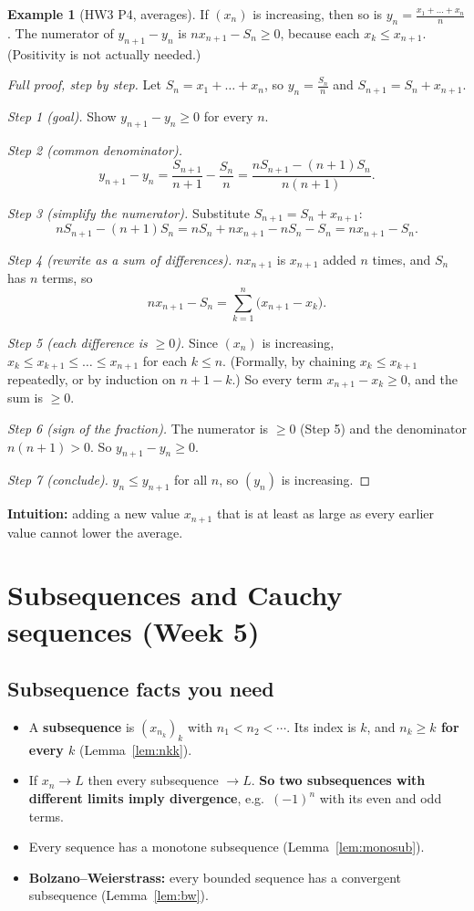 \documentclass[11pt]{article}
\theoremstyle{definition}
\newtheorem{ex}[defn]{Example}
\newcommand{\key}[1]{\textcolor{red!70!black}{\textbf{#1}}}
\begin{document}
\begin{ex}[HW3 P4, averages]
If $(x_n)$ is increasing, then so is $y_n=\frac{x_1+\dots+x_n}{n}$. The
numerator of $y_{n+1}-y_n$ is $nx_{n+1}-S_n\ge0$, because each
$x_k\le x_{n+1}$. (Positivity is not actually needed.)

\begin{proof}[Full proof, step by step]
Let $S_n=x_1+\dots+x_n$, so $y_n=\frac{S_n}n$ and $S_{n+1}=S_n+x_{n+1}$.

\emph{Step 1 (goal).} Show $y_{n+1}-y_n\ge0$ for every $n$.

\emph{Step 2 (common denominator).}
\[
y_{n+1}-y_n=\frac{S_{n+1}}{n+1}-\frac{S_n}{n}
=\frac{nS_{n+1}-(n+1)S_n}{n(n+1)}.
\]

\emph{Step 3 (simplify the numerator).} Substitute
$S_{n+1}=S_n+x_{n+1}$:
\[
nS_{n+1}-(n+1)S_n=nS_n+nx_{n+1}-nS_n-S_n=nx_{n+1}-S_n.
\]

\emph{Step 4 (rewrite as a sum of differences).} $nx_{n+1}$ is $x_{n+1}$
added $n$ times, and $S_n$ has $n$ terms, so
\[
nx_{n+1}-S_n=\sum_{k=1}^n\bigl(x_{n+1}-x_k\bigr).
\]

\emph{Step 5 (each difference is $\ge0$).} Since $(x_n)$ is increasing,
$x_k\le x_{k+1}\le\dots\le x_{n+1}$ for each $k\le n$. (Formally, by
chaining $x_k\le x_{k+1}$ repeatedly, or by induction on $n+1-k$.) So
every term $x_{n+1}-x_k\ge0$, and the sum is $\ge0$.

\emph{Step 6 (sign of the fraction).} The numerator is $\ge0$ (Step 5) and
the denominator $n(n+1)>0$. So $y_{n+1}-y_n\ge0$.

\emph{Step 7 (conclude).} $y_n\le y_{n+1}$ for all $n$, so $(y_n)$ is
increasing.
\end{proof}
\noindent\key{Intuition:} adding a new value $x_{n+1}$ that is at least as
large as every earlier value cannot lower the average.
\end{ex}

\section{Subsequences and Cauchy sequences (Week 5)}
\label{sec:cauchy}

\subsection{Subsequence facts you need}
\begin{itemize}[nosep]
  \item A \textbf{subsequence} is $(x_{n_k})_k$ with $n_1<n_2<\cdots$.
        Its index is $k$, and \key{$n_k\ge k$ for every $k$}
        (Lemma~\ref{lem:nkk}).
  \item If $x_n\to L$ then every subsequence $\to L$. \key{So two
        subsequences with different limits imply divergence}, e.g.\
        $(-1)^n$ with its even and odd terms.
  \item Every sequence has a monotone subsequence
        (Lemma~\ref{lem:monosub}).
  \item \textbf{Bolzano--Weierstrass:} every bounded sequence has a
        convergent subsequence (Lemma~\ref{lem:bw}).
\end{itemize}
\end{document}
